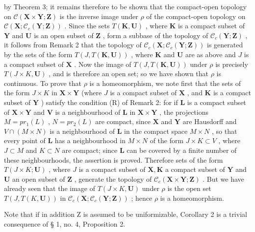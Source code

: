 by Theorem 3; it remains therefore to be shown that the compact-open topology on \(\mathcal{C}(\mathbf{X}\times\mathbf{Y};\mathbf{Z})\) is the inverse image under \(\rho\) of the compact-open topology on \(\mathcal{C}(\mathbf{X};\mathcal{C}_{c}(\mathbf{Y};\mathbf{Z}))\) . Since the sets \(T(\mathbf{K},\mathbf{U})\) , where \(\mathbf{K}\) is a compact subset of \(\mathbf{Y}\) and \(\mathbf{U}\) is an open subset of \(\mathbf{Z}\) , form a subbase of the topology of \(\mathcal{C}_{c}(\mathbf{Y};\mathbf{Z})\) , it follows from Remark 2 that the topology of \(\mathcal{C}_{c}(\mathbf{X};\mathcal{C}_{c}(\mathbf{Y};\mathbf{Z}))\) is generated by the sets of the form \(T(J,T(\mathbf{K},\mathbf{U}))\) , where \(\mathbf{K}\) and \(\mathbf{U}\) are as above and \(J\) is a compact subset of \(\mathbf{X}\) . Now the image of \(T(J,T(\mathbf{K},\mathbf{U}))\) under \(\rho\) is precisely \(T(J\times K,\mathbf{U})\) , and is therefore an open set; so we have shown that \(\rho\) is continuous. To prove that \(\rho\) is a homeomorphism, we note first that the sets of the form \(J\times K\) in \(\mathbf{X}\times\mathbf{Y}\) (where \(J\) is a compact subset of \(\mathbf{X}\) , and \(\mathbf{K}\) is a compact subset of \(\mathbf{Y}\) ) satisfy the condition (R) of Remark 2: for if \(\mathbf{L}\) is a compact subset of \(\mathbf{X}\times\mathbf{Y}\) and \(\mathbf{V}\) is a neighbourhood of \(\mathbf{L}\) in \(\mathbf{X}\times\mathbf{Y}\) , the projections \(M=pr_{1}(L)\) , \(N=pr_{2}(L)\) are compact, since \(\mathbf{X}\) and \(\mathbf{Y}\) are Hausdorff and \(V\cap(M\times N)\) is a neighbourhood of \(\mathbf{L}\) in the compact space \(M\times N\) , so that every point of \(\mathbf{L}\) has a neighbourhood in \(M\times N\) of the form \(J\times K\subset V\) , where \(J\subset M\) and \(K\subset N\) are compact; since \(\mathbf{L}\) can be covered by a finite number of these neighbourhoods, the assertion is proved. Therefore sets of the form \(T(J\times K;\mathbf{U})\) , where \(J\) is a compact subset of \(\mathbf{X},\mathbf{K}\) a compact subset of \(\mathbf{Y}\) and \(\mathbf{U}\) an open subset of \(\mathbf{Z}\) , generate the topology of \(\mathcal{C}_{c}(\mathbf{X}\times\mathbf{Y};\mathbf{Z})\) . But we have already seen that the image of \(T(J\times K,\mathbf{U})\) under \(\rho\) is the open set \(T(J,T(K,\mathbf{U}))\) in \(\mathcal{C}_{c}(\mathbf{X};\mathcal{C}_{c}(\mathbf{Y};\mathbf{Z}))\) ; hence \(\rho\) is a homeomorphism.

Note that if in addition Z is assumed to be uniformizable, Corollary 2 is a trivial consequence of § 1, no. 4, Proposition 2.

